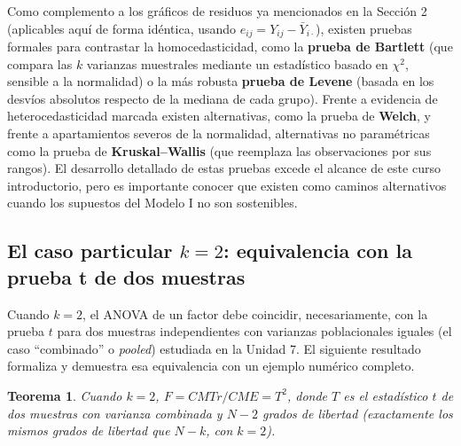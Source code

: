 \documentclass[11pt,a4paper]{article}
\theoremstyle{plain}
\newtheorem{teorema}{Teorema}[section]
\theoremstyle{definition}
\theoremstyle{remark}
\begin{document}
Como complemento a los gráficos de residuos ya mencionados en la Sección 2 (aplicables aquí de forma idéntica, usando $e_{ij}=Y_{ij}-\bar Y_{i\cdot}$), existen pruebas formales para contrastar la homocedasticidad, como la \textbf{prueba de Bartlett} (que compara las $k$ varianzas muestrales mediante un estadístico basado en $\chi^2$, sensible a la normalidad) o la más robusta \textbf{prueba de Levene} (basada en los desvíos absolutos respecto de la mediana de cada grupo). Frente a evidencia de heterocedasticidad marcada existen alternativas, como la prueba de \textbf{Welch}, y frente a apartamientos severos de la normalidad, alternativas no paramétricas como la prueba de \textbf{Kruskal--Wallis} (que reemplaza las observaciones por sus rangos). El desarrollo detallado de estas pruebas excede el alcance de este curso introductorio, pero es importante conocer que existen como caminos alternativos cuando los supuestos del Modelo I no son sostenibles.

\subsection{El caso particular \texorpdfstring{$k=2$}{k=2}: equivalencia con la prueba t de dos muestras}

Cuando $k=2$, el ANOVA de un factor debe coincidir, necesariamente, con la prueba $t$ para dos muestras independientes con varianzas poblacionales iguales (el caso ``combinado'' o \emph{pooled}) estudiada en la Unidad 7. El siguiente resultado formaliza y demuestra esa equivalencia con un ejemplo numérico completo.

\begin{teorema}
Cuando $k=2$, $F=CMTr/CME=T^2$, donde $T$ es el estadístico $t$ de dos muestras con varianza combinada y $N-2$ grados de libertad (exactamente los mismos grados de libertad que $N-k$, con $k=2$).
\end{teorema}
\end{document}
